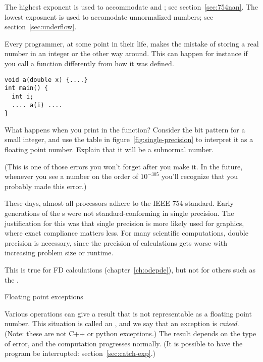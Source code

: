 The highest exponent is used to accommodate  and ;
see section~\ref{sec:754nan}.
The lowest exposnent is used to accomodate unnormalized numbers;
see section~\ref{sec:underflow}.

\begin{exercise}
  Every programmer, at some point in their life, makes the mistake of
  storing a real number in an integer or the other way around. This
  can happen for instance if you call a function differently from how
  it was defined.
\begin{lstlisting}
void a(double x) {....}
int main() {
  int i;
  .... a(i) ....
}
\end{lstlisting}
What happens when you print  in the function? Consider the bit
pattern for a small integer, and use the table in
figure~\ref{fig:single-precision} to interpret it as a floating point
number. Explain that it will be a subnormal number.

(This
  is one of those errors you won't forget after you make it. In the
  future, whenever you see a number on the order of $10^{-305}$ you'll
  recognize that you probably made this error.)
\end{exercise}

These days, almost all processors adhere to the IEEE 754 standard.
Early generations of the 
s were not standard-conforming in single precision.
The justification
for this was that single precision is more likely used for graphics,
where exact compliance matters less. For many scientific computations,
double precision is necessary, since the precision of calculations
gets worse with increasing problem size or runtime.
\begin{nopackt}
This is true for \ac{FD} calculations (chapter~\ref{ch:odepde}),
but not for others such as the .
\end{nopackt}


 {Floating point exceptions}

Various operations can give a result that is not representable as a
floating point number. This situation is called an ,
and we say that an exception is \emph{raised}.
(Note: these are not C++ or python exceptions.)
The result depends on the type of error, and the computation
progresses normally. (It is possible to have the program
be interrupted: section~\ref{sec:catch-exp}.)

